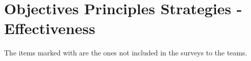 \chapter{Objectives Principles Strategies - Effectiveness}

The items marked with \XSolidBrush  are the ones not included in the surveys to the teams.

\newcommand*\addition{\item[\FiveStar]}
\newcommand*\removed{\item[\XSolidBrush]}

